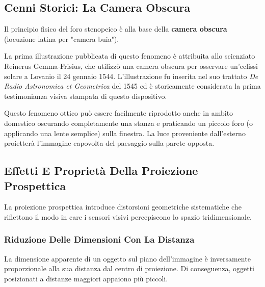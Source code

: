﻿\documentclass[11pt, a4paper]{article}
\begin{document}
\subsection{Cenni Storici: La Camera Obscura}

Il principio fisico del foro stenopeico è alla base della \textbf{camera obscura} (locuzione latina per "camera buia").


La prima illustrazione pubblicata di questo fenomeno è attribuita allo scienziato Reinerus Gemma-Frisius, che utilizzò una camera obscura per osservare un'eclissi solare a Lovanio il 24 gennaio 1544. L'illustrazione fu inserita nel suo trattato \emph{De Radio Astronomica et Geometrica} del 1545 ed è storicamente considerata la prima testimonianza visiva stampata di questo dispositivo.


Questo fenomeno ottico può essere facilmente riprodotto anche in ambito domestico oscurando completamente una stanza e praticando un piccolo foro (o applicando una lente semplice) sulla finestra. La luce proveniente dall'esterno proietterà l'immagine capovolta del paesaggio sulla parete opposta.



\subsection{Effetti E Proprietà Della Proiezione Prospettica}

La proiezione prospettica introduce distorsioni geometriche sistematiche che riflettono il modo in care i sensori visivi percepiscono lo spazio tridimensionale.

\subsubsection{Riduzione Delle Dimensioni Con La Distanza}

La dimensione apparente di un oggetto sul piano dell'immagine è inversamente proporzionale alla sua distanza dal centro di proiezione. Di conseguenza, oggetti posizionati a distanze maggiori appaiono più piccoli.
\end{document}
